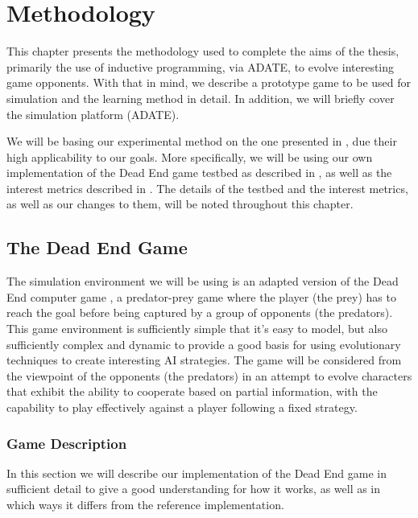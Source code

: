 \cleardoublepage
\chapter{Methodology}
\label{methodology}

This chapter presents the methodology used to complete the aims of the thesis,
primarily the use of inductive programming, via ADATE, to evolve interesting
game opponents. With that in mind, we describe a prototype game to be used for
simulation and the learning method in detail. In addition, we will briefly cover
the simulation platform (ADATE).

We will be basing our experimental method on the one presented in
\citet{yannakakis2005ai}, due their high applicability to our goals. More
specifically, we will be using our own implementation of the Dead End game
testbed as described in \citet[Chap.~5]{yannakakis2005ai}, as well as the
interest metrics described in \citet[Chap.~2]{yannakakis2005ai}. The details of
the testbed and the interest metrics, as well as our changes to them, will be
noted throughout this chapter.

\section{The Dead End Game}
\label{sec:game}

The simulation environment we will be using is an adapted version of the Dead
End computer game \citep[Chap.~5]{yannakakis2005ai}, a predator-prey game where
the player (the prey) has to reach the goal before being captured by a group of
opponents (the predators). This game environment is sufficiently simple that
it's easy to model, but also sufficiently complex and dynamic to provide a good
basis for using evolutionary techniques to create interesting AI strategies. The
game will be considered from the viewpoint of the opponents (the predators) in
an attempt to evolve characters that exhibit the ability to cooperate based on
partial information, with the capability to play effectively against a player
following a fixed strategy.

\subsection{Game Description}
\label{sec:game-description}

In this section we will describe our implementation of the Dead End game in
sufficient detail to give a good understanding for how it works, as well as in
which ways it differs from the reference implementation.
\citep[see][Chap.~5]{yannakakis2005ai}

